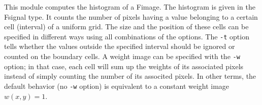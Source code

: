 This module computes the histogram of a Fimage.
The histogram is given in the Fsignal type.
It counts the number of pixels having a value belonging to a certain
cell (interval) of a uniform grid.
The size and the position of these cells can be specified in different
ways using all combinations of the options. The \verb+-t+ option tells
whether the values outside the specified interval should be ignored or
counted on the boundary cells. A weight image can be specified with
the \verb+-w+ option; in that case, each cell will sum up the weights
of its associated pixels instead of simply counting the number of its
associted pixels. In other terms, the default behavior (no \verb+-w+
option) is equivalent to a constant weight image $w(x,y)=1$.





